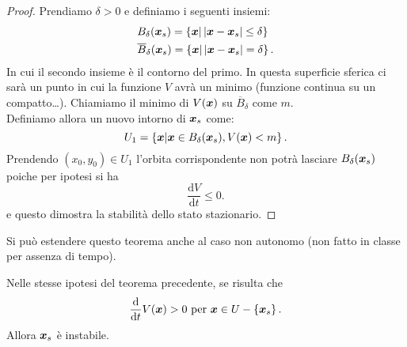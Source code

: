 \begin{proof}
Prendiamo $\delta >0$ e definiamo i seguenti insiemi:
\[\begin{aligned}
    &B_{\delta }(\boldsymbol{x}_s) = \left\{\boldsymbol{x}| \left|\boldsymbol{x}-\boldsymbol{x}_s\right|\le \delta\right\}\\
    &\overline{B}_{\delta }(\boldsymbol{x}_s) = \left\{\boldsymbol{x}| \left|\boldsymbol{x}-\boldsymbol{x}_s\right| = \delta\right\}
.\end{aligned}\]
\noindent
In cui il secondo insieme è il contorno del primo. In questa superficie sferica ci sarà un punto in cui la funzione $V$ avrà un minimo (funzione continua su un compatto\ldots). Chiamiamo il minimo di $V(\boldsymbol{x})$ su $\overline{B}_\delta$ come $m$.\\
Definiamo allora un nuovo intorno di $\boldsymbol{x}_s$ come:
\[
    U_1 = \left\{\boldsymbol{x}| \boldsymbol{x}\in B_\delta (\boldsymbol{x}_s), V(\boldsymbol{x}) < m \right\}
.\] 
Prendendo $(x_0, y_0) \in U_1$ l'orbita corrispondente non potrà lasciare $B_\delta (\boldsymbol{x}_s) $ poiche per ipotesi si ha
\[
    \frac{\text{d} V}{\text{d} t} \le 0
.\] 
e questo dimostra la stabilità dello stato stazionario.
\end{proof}
\noindent
Si può estendere questo teorema anche al caso non autonomo (non fatto in classe per assenza di tempo).
\begin{thm}[Instabilità]
    Nelle stesse ipotesi del teorema precedente, se risulta che 
     \[
	 \frac{\text{d}}{\text{d} t} V(\boldsymbol{x}) > 0 \text{ per } \boldsymbol{x}\in U-\left\{\boldsymbol{x}_s\right\}
    .\] 
    Allora $\boldsymbol{x}_s$ è instabile.
\end{thm}
\noindent
